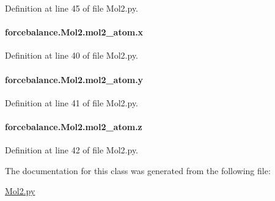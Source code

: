 Definition at line 45 of file Mol2.\-py.

\hypertarget{classforcebalance_1_1Mol2_1_1mol2__atom_a6680fe011206f55945c3941e0108f34f}{
\paragraph[{x}]{\setlength{\rightskip}{0pt plus 5cm}forcebalance.\-Mol2.\-mol2\-\_\-atom.\-x}}\label{classforcebalance_1_1Mol2_1_1mol2__atom_a6680fe011206f55945c3941e0108f34f}


Definition at line 40 of file Mol2.\-py.

\hypertarget{classforcebalance_1_1Mol2_1_1mol2__atom_ae74389ec40d89eed9f4685de924cd6e0}{
\paragraph[{y}]{\setlength{\rightskip}{0pt plus 5cm}forcebalance.\-Mol2.\-mol2\-\_\-atom.\-y}}\label{classforcebalance_1_1Mol2_1_1mol2__atom_ae74389ec40d89eed9f4685de924cd6e0}


Definition at line 41 of file Mol2.\-py.

\hypertarget{classforcebalance_1_1Mol2_1_1mol2__atom_a24f92b1eb86891ecdfdeb539d29f01eb}{
\paragraph[{z}]{\setlength{\rightskip}{0pt plus 5cm}forcebalance.\-Mol2.\-mol2\-\_\-atom.\-z}}\label{classforcebalance_1_1Mol2_1_1mol2__atom_a24f92b1eb86891ecdfdeb539d29f01eb}


Definition at line 42 of file Mol2.\-py.



The documentation for this class was generated from the following file\-:\begin{DoxyCompactItemize}
\item 
\hyperlink{Mol2_8py}{Mol2.\-py}\end{DoxyCompactItemize}
